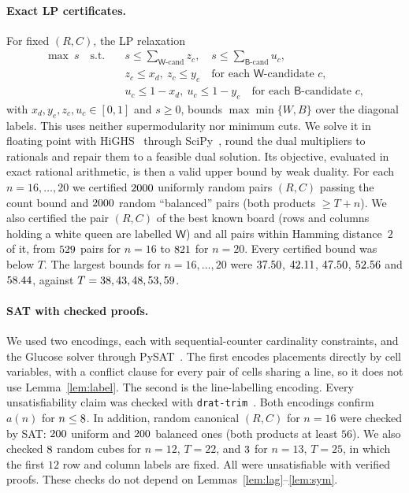 \documentclass[11pt]{article}
\theoremstyle{remark}
\newcommand{\W}{\mathsf W}
\newcommand{\B}{\mathsf B}
\begin{document}
\paragraph{Exact LP certificates.} For fixed $(R,C)$, the LP relaxation
\begin{align*}
\max\ s\quad\text{s.t.}\quad &s\le\textstyle\sum_{\W\text{-cand}}z_c,\quad s\le\sum_{\B\text{-cand}}u_c,\\
&z_c\le x_d,\ z_c\le y_e\quad\text{for each $\W$-candidate $c$},\\
&u_c\le1-x_d,\ u_c\le1-y_e\quad\text{for each $\B$-candidate $c$},
\end{align*}
with $x_d,y_e,z_c,u_c\in[0,1]$ and $s\ge0$,
bounds $\max\min\{W,B\}$ over the diagonal labels. This uses neither supermodularity nor minimum cuts.
We solve it in floating point with HiGHS~\cite{HiGHS} through SciPy~\cite{SciPy}, round the dual
multipliers to rationals and repair them to a feasible dual solution. Its objective, evaluated in exact
rational arithmetic, is then a valid upper bound by weak duality. For each $n=16,\dots,20$ we certified
$2000$ uniformly random pairs $(R,C)$ passing the count bound and $2000$ random
``balanced'' pairs (both products $\ge T+n$). We also certified the pair $(R,C)$ of the best known board
(rows and columns holding a white queen are labelled $\W$) and all pairs within Hamming distance~$2$ of
it, from $529$ pairs for $n=16$ to $821$ for $n=20$. Every
certified bound was below $T$. The largest bounds for $n=16,\dots,20$ were
$37.50$, $42.11$, $47.50$, $52.56$ and $58.44$,
against $T=38,43,48,53,59$.

\paragraph{SAT with checked proofs.} We used two encodings, each with sequential-counter cardinality
constraints, and the Glucose solver through PySAT~\cite{PySAT}. The first encodes placements directly by
cell variables, with a conflict clause for every pair of cells sharing a line, so it does not use
Lemma~\ref{lem:label}. The second is the line-labelling encoding. Every unsatisfiability claim was checked
with \texttt{drat-trim}~\cite{DRAT}. Both encodings confirm $a(n)$ for $n\le8$. In addition,
random canonical $(R,C)$ for $n=16$ were checked by SAT: $200$ uniform and $200$
balanced ones (both products at least $56$). We also checked $8$ random cubes for $n=12$,
$T=22$, and $3$ for $n=13$, $T=25$, in which the first $12$ row and column labels are
fixed. All were unsatisfiable with verified proofs. These checks
do not depend on Lemmas~\ref{lem:lag}--\ref{lem:sym}.
\end{document}
